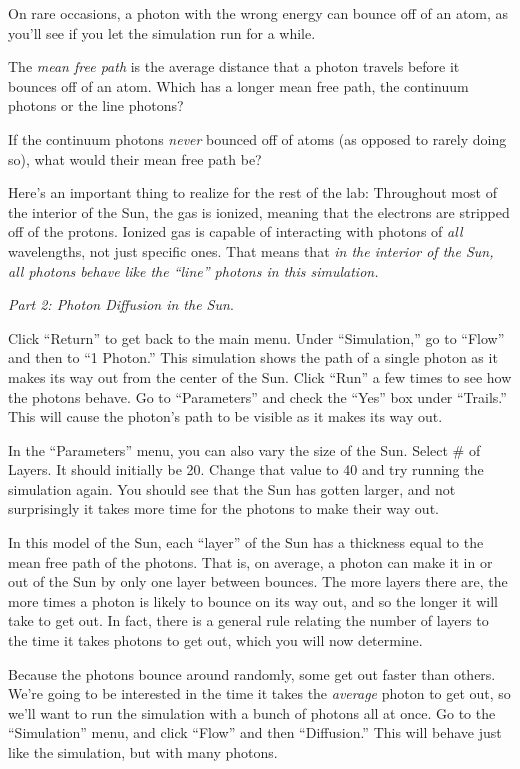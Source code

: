 On rare occasions, a photon
with the wrong energy can bounce off of an atom, as you'll see if you 
let the simulation run for a while.

The {\it mean free path} is the average distance that a photon travels
before it bounces off of an atom.  Which has a longer mean free path,
the continuum photons or the line photons?

\vskip 1in

If the continuum photons {\it never} bounced off of atoms (as opposed
to rarely doing so), what would their mean free path be?

\vskip 1in

Here's an important thing to realize for the rest of the lab:
Throughout most of the interior of the Sun, the gas is ionized,
meaning that the electrons are stripped off of the protons.  Ionized
gas is capable of interacting with photons of {\it all} wavelengths,
not just specific ones.  That means that {\it in the interior of the
Sun, all photons behave like the ``line'' photons in this simulation.}

{\it Part 2: Photon Diffusion in the Sun}.

Click ``Return'' to get back to the main menu.  Under ``Simulation,'' 
go to ``Flow'' and then to ``1 Photon.''  
This simulation shows the path of a single photon as it makes its
way out from the center of the Sun.  Click ``Run'' a few times to 
see how the photons behave.  Go to ``Parameters'' and check the ``Yes''
box under ``Trails.''  This will cause the photon's path to be
visible as it makes its way out.

In the ``Parameters'' menu, you can also vary the size of the Sun.
Select \# of Layers.  It should initially be 20.  Change that value to 40
and try running the simulation again.  You should see that the Sun
has gotten larger, and not surprisingly it takes more time for the photons
to make their way out.

In this model of the Sun, each ``layer'' of the Sun has a thickness
equal to the mean free path of the photons.  That is, on average,
a photon can make it in or out of the Sun by only one layer between
bounces.  The more layers there are, the more times a photon is likely
to bounce on its way out, and so the longer it will take to get out.
In fact, there is a general rule relating the number of layers to the
time it takes photons to get out, which you will now determine.

Because the photons bounce around randomly, some get out faster than others.
We're going to be interested in the time it takes the \textit{average}
photon to get out, so we'll want to run the simulation with a bunch of photons
all at once. Go to the ``Simulation'' menu, and click ``Flow'' and then
``Diffusion.'' This will behave just like the simulation, but with many photons.


